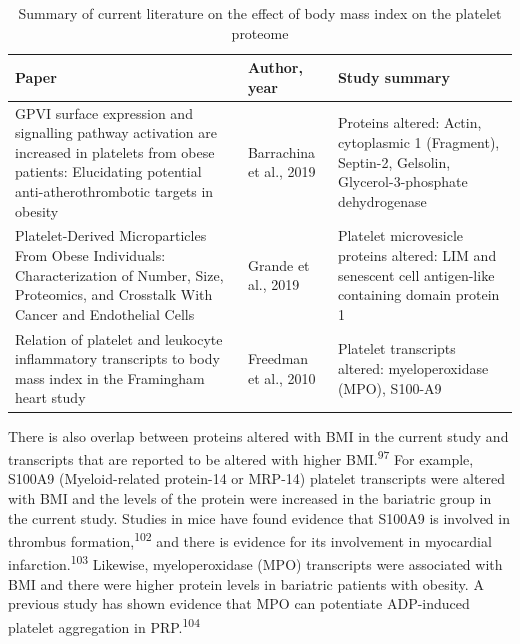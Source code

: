 \documentclass[11pt,twoside]{bristolthesis}
\begin{document}
\begin{landscape}\begin{table}

\caption{\label{tab:proteome-lit}Summary of current literature on the effect of body mass index on the platelet proteome}
\centering
\begin{tabu} to 
\toprule
Paper & Author, year & Study summary\\
\midrule
GPVI surface expression and signalling pathway activation are increased in platelets from obese patients: Elucidating potential anti-atherothrombotic targets in obesity & Barrachina et al., 2019 & Proteins altered: Actin, cytoplasmic 1 (Fragment), Septin-2, Gelsolin, Glycerol-3-phosphate dehydrogenase\\
Platelet-Derived Microparticles From Obese Individuals: Characterization of Number, Size, Proteomics, and Crosstalk With Cancer and Endothelial Cells & Grande et al., 2019 & Platelet microvesicle proteins altered: LIM and senescent cell antigen-like containing domain protein 1\\
Relation of platelet and leukocyte inflammatory transcripts to body mass index in the Framingham heart study & Freedman et al., 2010 & Platelet transcripts altered: myeloperoxidase (MPO), S100-A9\\
\bottomrule
\end{tabu}
\end{table}
\end{landscape}
There is also overlap between proteins altered with BMI in the current study and transcripts that are reported to be altered with higher BMI.\textsuperscript{97} For example, S100A9 (Myeloid-related protein-14 or MRP-14) platelet transcripts were altered with BMI and the levels of the protein were increased in the bariatric group in the current study. Studies in mice have found evidence that S100A9 is involved in thrombus formation,\textsuperscript{102} and there is evidence for its involvement in myocardial infarction.\textsuperscript{103} Likewise, myeloperoxidase (MPO) transcripts were associated with BMI and there were higher protein levels in bariatric patients with obesity. A previous study has shown evidence that MPO can potentiate ADP-induced platelet aggregation in PRP.\textsuperscript{104}
\end{document}
